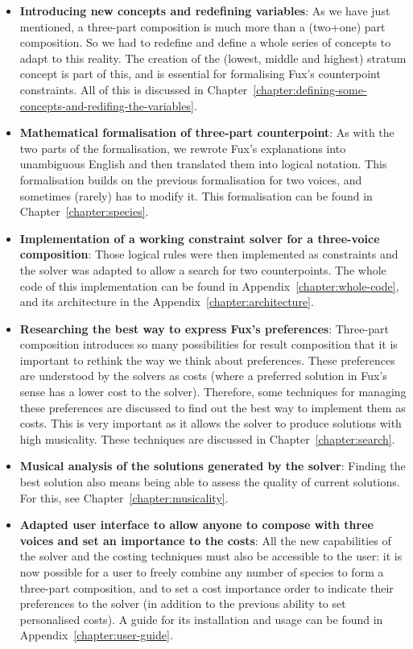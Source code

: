 \begin{itemize}
    \item \textbf{Introducing new concepts and redefining variables}:
    As we have just mentioned, a three-part composition is much more than a (two+one) part composition. So we had to redefine and define a whole series of concepts to adapt to this reality. The creation of the (lowest, middle and highest) stratum concept is part of this, and is essential for formalising Fux's counterpoint constraints. All of this is discussed in Chapter~\ref{chapter:defining-some-concepts-and-redifing-the-variables}.
    \item \textbf{Mathematical formalisation of three-part counterpoint}: As with the two parts of the formalisation, we rewrote Fux's explanations into unambiguous English and then translated them into logical notation. This formalisation builds on the previous formalisation for two voices, and sometimes (rarely) has to modify it. This formalisation can be found in Chapter~\ref{chapter:species}.
    \item \textbf{Implementation of a working constraint solver for a three-voice composition}: Those logical rules were then implemented as constraints and the solver was adapted to allow a search for two counterpoints. The whole code of this implementation can be found in Appendix~\ref{chapter:whole-code}, and its architecture in the Appendix~\ref{chapter:architecture}.
    \item \textbf{Researching the best way to express Fux's preferences}: Three-part composition introduces so many possibilities for result composition that it is important to rethink the way we think about preferences. These preferences are understood by the solvers as costs (where a preferred solution in Fux's sense has a lower cost to the solver). Therefore, some techniques for managing these preferences are discussed to find out the best way to implement them as costs. This is very important as it allows the solver to produce solutions with high musicality. These techniques are discussed in Chapter~\ref{chapter:search}.
    \item \textbf{Musical analysis of the solutions generated by the solver}: Finding the best solution also means being able to assess the quality of current solutions. For this, see Chapter~\ref{chapter:musicality}. 
    \item \textbf{Adapted user interface to allow anyone to compose with three voices and set an importance to the costs}: All the new capabilities of the solver and the costing techniques must also be accessible to the user: it is now possible for a user to freely combine any number of species to form a three-part composition, and to set a cost importance order to indicate their preferences to the solver (in addition to the previous ability to set personalised costs). A guide for its installation and usage can be found in Appendix~\ref{chapter:user-guide}.
\end{itemize}


